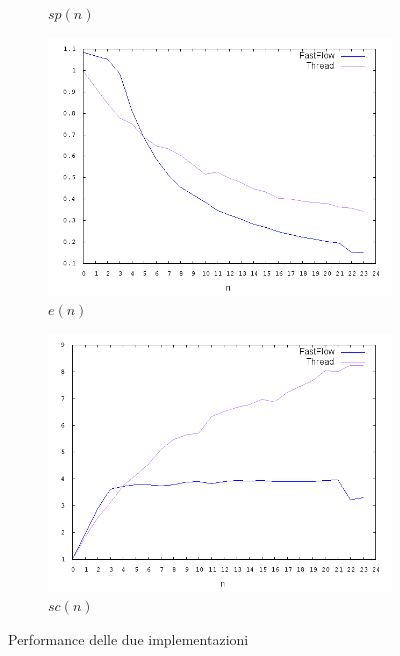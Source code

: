 \documentclass[12pt]{article}
\begin{document}
\begin{figure}[!htbp]
\begin{subfigure}{.55\textwidth}
  \caption{$sp(n)$}
  \label{fig:ftsec}
\end{subfigure}
\begin{subfigure}{.55\textwidth}
  \centering
  \includegraphics[scale=.35,keepaspectratio]{ef.png}
  \caption{$e(n)$}
  \label{fig:lsec}
\end{subfigure}
\begin{subfigure}{.55\textwidth}
  \centering
  \includegraphics[scale=.35,keepaspectratio]{sc.png}
  \caption{$sc(n)$}
  \label{fig:cacc}
\end{subfigure}
\caption{Performance delle due implementazioni}
\label{img:plottot}
\end{figure}

\newpage
\appendix
\end{document}
